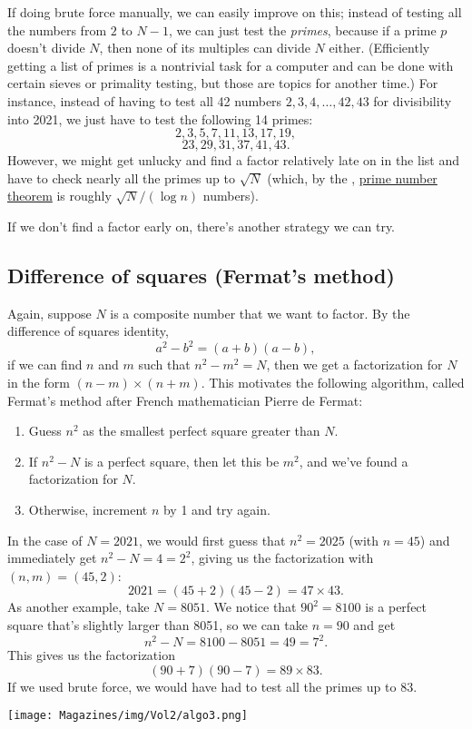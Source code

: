 \documentclass{article}
\begin{document}
\begin{multicols}{3}
If doing brute force manually, we can easily improve on this; instead of testing all the numbers from $2$ to $N - 1$, we can just test the \textit{primes}, because if a prime $p$ doesn't divide $N$, then none of its multiples can divide $N$ either. (Efficiently getting a list of primes is a nontrivial task for a computer and can be done with certain sieves or primality testing, but those are topics for another time.) For instance, instead of having to test all 42 numbers $2, 3, 4, \dots, 42, 43$ for divisibility into 2021, we just have to test the following 14 primes:
$$2, 3, 5, 7, 11, 13, 17, 19, $$
$$ 23, 29, 31, 37, 41, 43.$$
However, we might get unlucky and find a factor relatively late on in the list and have to check nearly all the primes up to $\sqrt{N}$ (which, by the , \href{https://en.wikipedia.org/wiki/Prime_number_theorem}{prime number theorem} is roughly $\sqrt{N}/(\log n)$ numbers).

If we don't find a factor early on, there's another strategy we can try.


\subsection*{Difference of squares (Fermat's method)}


Again, suppose $N$ is a composite number that we want to factor. By the difference of squares identity,
$$a^2 - b^2 = (a + b)(a - b),$$
if we can find $n$ and $m$ such that $n^2 - m^2 = N$, then we get a factorization for $N$ in the form $(n - m) \times (n + m)$. This motivates the following algorithm, called Fermat's method after French mathematician Pierre de Fermat:
\begin{enumerate}
    \item Guess $n^2$ as the smallest perfect square greater than $N$.
    \item If $n^2 - N$ is a perfect square, then let this be $m^2$, and we've found a factorization for $N$.
    \item Otherwise, increment $n$ by 1 and try again.
\end{enumerate}
In the case of $N = 2021$, we would first guess that $n^2 = 2025$ (with $n = 45$) and immediately get $n^2 - N = 4 = 2^2$, giving us the factorization with $(n, m) = (45, 2)$:
$$2021 = (45 + 2)(45 - 2) = 47 \times 43.$$
As another example, take $N = 8051$.  We notice that $90^2 = 8100$ is a perfect square that's slightly larger than 8051, so we can take $n = 90$ and get
$$n^2 - N = 8100 - 8051 = 49 = 7^2.$$
This gives us the factorization
$$(90 + 7)(90 - 7) = 89 \times 83.$$
If we used brute force, we would have had to test all the primes up to 83.
\begin{center}
    \texttt{[image: Magazines/img/Vol2/algo3.png]}
\end{center}


\end{multicols}
\end{document}
